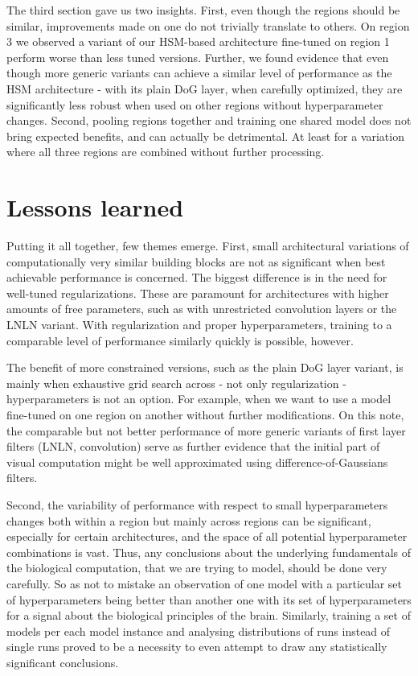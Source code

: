 The third section gave us two insights. First, even though the regions should be similar, improvements made on one do not trivially translate to others. On region 3 we observed a variant of our {HSM-based architecture} fine-tuned on region 1 perform worse than less tuned versions. Further, we found evidence that even though more generic variants can achieve a similar level of performance as the {HSM architecture} - with its plain DoG layer, when carefully optimized, they are significantly less robust when used on other regions without hyperparameter changes. Second, pooling regions together and training one shared model does not bring expected benefits, and can actually be detrimental. At least for a variation where all three regions are combined without further processing.

\section*{Lessons learned}

Putting it all together, few themes emerge. First, small architectural variations of computationally very similar building blocks are not as significant when best achievable performance is concerned. The biggest difference is in the need for well-tuned regularizations. These are paramount for architectures with higher amounts of free parameters, such as with unrestricted convolution layers or the LNLN variant. With regularization and proper hyperparameters, training to a comparable level of performance similarly quickly is possible, however. 

The benefit of more constrained versions, such as the plain DoG layer variant, is mainly when exhaustive grid search across - not only regularization - hyperparameters is not an option. For example, when we want to use a model fine-tuned on one region on another without further modifications. On this note, the comparable but not better performance of more generic variants of first layer filters (LNLN, convolution) serve as further evidence that the initial part of visual computation might be well approximated using difference-of-Gaussians filters.

Second, the variability of performance with respect to small hyperparameters changes both within a region but mainly across regions can be significant, especially for certain architectures, and the space of all potential hyperparameter combinations is vast. Thus, any conclusions about the underlying fundamentals of the biological computation, that we are trying to model, should be done very carefully. So as not to mistake an observation of one model with a particular set of hyperparameters being better than another one with its set of hyperparameters for a signal about the biological principles of the brain. Similarly, training a set of models per each model instance and analysing distributions of runs instead of single runs proved to be a necessity to even attempt to draw any statistically significant conclusions.

